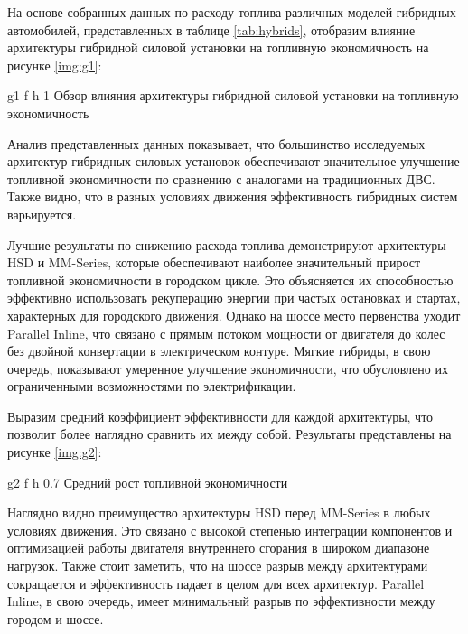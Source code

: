 \newpage

На основе собранных данных по расходу топлива различных моделей гибридных автомобилей, представленных в таблице \ref{tab:hybrids}, отобразим влияние архитектуры гибридной силовой установки на топливную экономичность на рисунке \ref{img:g1}:

    {g1} %
    {f} %
    {h} %
    {1\textwidth} %
    {Обзор влияния архитектуры гибридной силовой установки на топливную экономичность} %

Анализ представленных данных показывает, что большинство исследуемых архитектур гибридных силовых установок обеспечивают значительное улучшение топливной экономичности по сравнению с аналогами на традиционных ДВС. Также видно, что в разных условиях движения эффективность гибридных систем варьируется.

Лучшие результаты по снижению расхода топлива демонстрируют архитектуры HSD и MM-Series, которые обеспечивают наиболее значительный прирост топливной экономичности в городском цикле. Это объясняется их способностью эффективно использовать рекуперацию энергии при частых остановках и стартах, характерных для городского движения. Однако на шоссе место первенства уходит Parallel Inline, что связано с прямым потоком мощности от двигателя до колес без двойной конвертации в электрическом контуре. Мягкие гибриды, в свою очередь, показывают умеренное улучшение экономичности, что обусловлено их ограниченными возможностями по электрификации.

\newpage

Выразим средний коэффициент эффективности для каждой архитектуры, что позволит более наглядно сравнить их между собой. Результаты представлены на рисунке \ref{img:g2}:

    {g2} %
    {f} %
    {h} %
    {0.7\textwidth} %
    {Средний рост топливной экономичности} %

Наглядно видно преимущество архитектуры HSD перед MM-Series в любых условиях движения. Это связано с высокой степенью интеграции компонентов и оптимизацией работы двигателя внутреннего сгорания в широком диапазоне нагрузок. Также стоит заметить, что на шоссе разрыв между архитектурами сокращается и эффективность падает в целом для всех архитектур. Parallel Inline, в свою очередь, имеет минимальный разрыв по эффективности между городом и шоссе.

